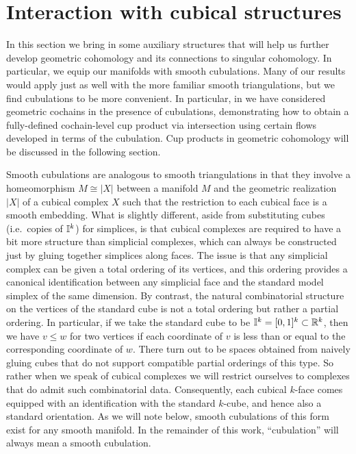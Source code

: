 

\section{Interaction with cubical structures}
\label{S: transversality}

In this section we bring in some auxiliary structures that will help us further develop geometric cohomology and its connections to singular cohomology. In particular, we equip our manifolds with smooth cubulations. Many of our results would apply just as well with the more familiar smooth triangulations, but we find cubulations to be more convenient. In particular, in \cite{FMS-flows} we have considered geometric cochains in the presence of cubulations, demonstrating how to obtain a fully-defined cochain-level cup product via intersection using certain flows developed in terms of the cubulation. Cup products in geometric cohomology will be discussed in the following section.

Smooth cubulations are analogous to smooth triangulations in that they involve a homeomorphism $M \cong |X|$ between a manifold $M$ and the geometric realization $|X|$ of a cubical complex $X$ such that the restriction to each cubical face is a smooth embedding. What is slightly different, aside from substituting cubes (i.e.\ copies of $\mathbb{I}^k$) for simplices, is that cubical complexes are required to have a bit more structure than simplicial complexes, which can always be constructed just by gluing together simplices along faces. The issue is that any simplicial complex can be given a total ordering of its vertices, and this ordering provides a canonical identification between any simplicial face and the standard model simplex of the same dimension. By contrast, the natural combinatorial structure on the vertices of the standard cube is not a total ordering but rather a partial ordering. In particular, if we take the standard cube to be $\mathbb{I}^k = [0,1]^k \subset \mathbb{R}^k$, then we have $v \leq w$ for two vertices if each coordinate of $v$ is less than or equal to the corresponding coordinate of $w$. There turn out to be spaces obtained from naively gluing cubes that do not support compatible partial orderings of this type. So rather when we speak of cubical complexes we will restrict ourselves to complexes that do admit such combinatorial data.
Consequently, each cubical $k$-face comes equipped with an identification with the standard $k$-cube, and hence also a standard orientation. As we will note below, smooth cubulations of this form exist for any smooth manifold. In the remainder of this work, ``cubulation'' will always mean a smooth cubulation.

